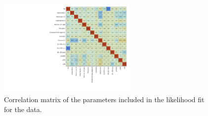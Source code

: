 \begin{figure}[!h]
    \centering
    \includegraphics[width=0.6\textwidth]{ubonn-thesis/Chapters/Chapters_07/Figure/Data/CorrMatrix.pdf}
    \caption{ Correlation matrix of the parameters included in the likelihood fit for the data.}
    \label{fig:correlation}
\end{figure}

